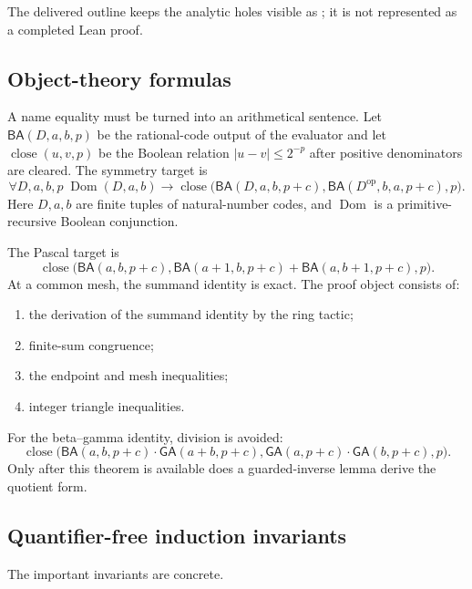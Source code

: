 The delivered outline keeps the analytic holes visible as ; it is not represented as a completed Lean proof.

\subsection{Object-theory formulas}

A name equality must be turned into an arithmetical sentence.  Let
$\mathsf{BA}(D,a,b,p)$ be the rational-code output of the evaluator and let
$\operatorname{close}(u,v,p)$ be the Boolean relation
$|u-v|\le2^{-p}$ after positive denominators are cleared.  The symmetry target is
\[
 \forall D,a,b,p\;
 \operatorname{Dom}(D,a,b)\to
 \operatorname{close}\bigl(
 \mathsf{BA}(D,a,b,p+c),
 \mathsf{BA}(D^\mathrm{op},b,a,p+c),p\bigr).
\]
Here $D,a,b$ are finite tuples of natural-number codes, and
$\operatorname{Dom}$ is a primitive-recursive Boolean conjunction.

The Pascal target is
\[
 \operatorname{close}\bigl(
 \mathsf{BA}(a,b,p+c),
 \mathsf{BA}(a+1,b,p+c)+
 \mathsf{BA}(a,b+1,p+c),p\bigr).
\]
At a common mesh, the summand identity is exact.  The proof object consists of:
\begin{enumerate}
\item the derivation of the summand identity by the ring tactic;
\item finite-sum congruence;
\item the endpoint and mesh inequalities;
\item integer triangle inequalities.
\end{enumerate}

For the beta--gamma identity, division is avoided:
\[
 \operatorname{close}\bigl(
 \mathsf{BA}(a,b,p+c)\cdot\mathsf{GA}(a+b,p+c),
 \mathsf{GA}(a,p+c)\cdot\mathsf{GA}(b,p+c),p\bigr).
\]
Only after this theorem is available does a guarded-inverse lemma derive the quotient form.

\subsection{Quantifier-free induction invariants}

The important invariants are concrete.

